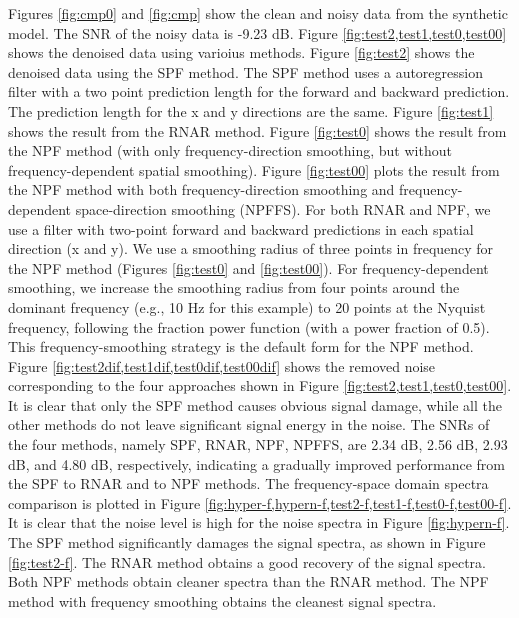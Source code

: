 Figures \ref{fig:cmp0} and \ref{fig:cmp} show the clean and noisy data from the synthetic model. The SNR of the noisy data is -9.23 dB. Figure \ref{fig:test2,test1,test0,test00} shows the denoised data using varioius methods. Figure \ref{fig:test2} shows the denoised data using the SPF method. The SPF method uses a  autoregression filter with a two point prediction length for the forward and backward prediction. The prediction length for the x and y directions are the same. Figure \ref{fig:test1} shows the result from the RNAR method. Figure \ref{fig:test0} shows the result from the NPF method (with only frequency-direction smoothing, but without frequency-dependent spatial smoothing). Figure \ref{fig:test00} plots the result from the NPF method with both frequency-direction smoothing and frequency-dependent space-direction smoothing (NPFFS). For both RNAR and NPF, we use a  filter with two-point forward and backward predictions in each spatial direction (x and y). We use a smoothing radius of three points in frequency for the NPF method (Figures \ref{fig:test0} and \ref{fig:test00}).  For frequency-dependent smoothing, we increase the smoothing radius from four points around the dominant frequency (e.g., 10 Hz for this example) to 20 points at the Nyquist frequency, following the fraction power function (with a power fraction of 0.5). This frequency-smoothing strategy is the default form for the NPF method. Figure \ref{fig:test2dif,test1dif,test0dif,test00dif} shows the removed noise corresponding to the four approaches shown in Figure \ref{fig:test2,test1,test0,test00}.  It is clear that only the SPF method causes obvious signal damage, while all the other methods do not leave significant signal energy in the noise. The SNRs of the four methods, namely SPF, RNAR, NPF, NPFFS, are 
2.34 dB, 2.56 dB, 2.93 dB, and 4.80 dB, respectively, indicating a gradually improved performance from the SPF to RNAR and to NPF methods.  The frequency-space domain spectra comparison is plotted in Figure \ref{fig:hyper-f,hypern-f,test2-f,test1-f,test0-f,test00-f}. It is clear that the noise level is high for the noise spectra in Figure \ref{fig:hypern-f}. The SPF method significantly damages the signal spectra, as shown in Figure \ref{fig:test2-f}. The RNAR method obtains a good recovery of the signal spectra. Both NPF methods obtain cleaner spectra than the RNAR method. The NPF method with frequency smoothing obtains the cleanest signal spectra.

